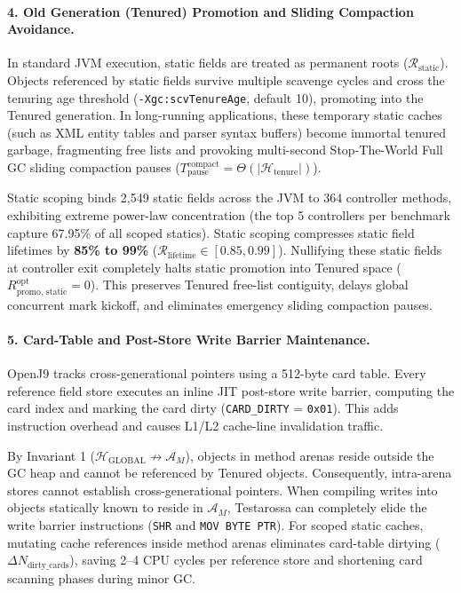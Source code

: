\documentclass[12pt,a4paper]{article}
\begin{document}
\paragraph{4. Old Generation (Tenured) Promotion and Sliding Compaction Avoidance.}
In standard JVM execution, static fields are treated as permanent roots ($\mathcal{R}_{\text{static}}$). Objects referenced by static fields survive multiple scavenge cycles and cross the tenuring age threshold (\texttt{-Xgc:scvTenureAge}, default 10), promoting into the Tenured generation. In long-running applications, these temporary static caches (such as XML entity tables and parser syntax buffers) become immortal tenured garbage, fragmenting free lists and provoking multi-second Stop-The-World Full GC sliding compaction pauses ($T_{\text{pause}}^{\text{compact}} = \Theta(|\mathcal{H}_{\text{tenure}}|)$).

Static scoping binds 2{,}549 static fields across the JVM to 364 controller methods, exhibiting extreme power-law concentration (the top 5 controllers per benchmark capture 67.95\% of all scoped statics). Static scoping compresses static field lifetimes by \textbf{85\% to 99\%} ($\mathcal{R}_{\text{lifetime}} \in [0.85, 0.99]$). Nullifying these static fields at controller exit completely halts static promotion into Tenured space ($R_{\text{promo, static}}^{\text{opt}} = 0$). This preserves Tenured free-list contiguity, delays global concurrent mark kickoff, and eliminates emergency sliding compaction pauses.

\paragraph{5. Card-Table and Post-Store Write Barrier Maintenance.}
OpenJ9 tracks cross-generational pointers using a 512-byte card table. Every reference field store executes an inline JIT post-store write barrier, computing the card index and marking the card dirty (\texttt{CARD\_DIRTY} = \texttt{0x01}). This adds instruction overhead and causes L1/L2 cache-line invalidation traffic.

By Invariant 1 ($\mathcal{H}_{\text{GLOBAL}} \not\to \mathcal{A}_M$), objects in method arenas reside outside the GC heap and cannot be referenced by Tenured objects. Consequently, intra-arena stores cannot establish cross-generational pointers. When compiling writes into objects statically known to reside in $\mathcal{A}_M$, Testarossa can completely elide the write barrier instructions (\texttt{SHR} and \texttt{MOV BYTE PTR}). For scoped static caches, mutating cache references inside method arenas eliminates card-table dirtying ($\Delta N_{\text{dirty\_cards}}$), saving 2--4 CPU cycles per reference store and shortening card scanning phases during minor GC.
\end{document}
